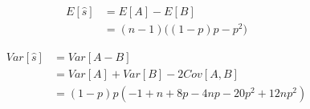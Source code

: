 \documentclass{article}
\begin{document}
    \begin{align*}
        E[\hat{s}] 
            &= E[A] - E[B] \\
            &= (n-1)\bigg((1-p)p - p^2\bigg)
    \end{align*}

    \begin{align*}
        Var[\hat{s}] 
            &= Var[A-B] \\
            &= Var[A] + Var[B] - 2Cov[A, B] \\
            &= (1-p)p(-1+n+8p-4np-20p^2+12np^2)
    \end{align*}
\end{document}
